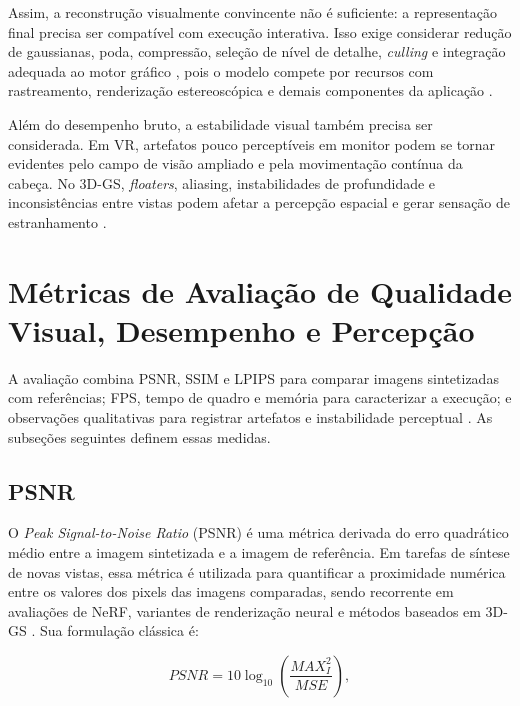 Assim, a reconstrução visualmente convincente não é suficiente: a representação final precisa ser compatível com execução interativa. Isso exige considerar redução de gaussianas, poda, compressão, seleção de nível de detalhe, \textit{culling} e integração adequada ao motor gráfico \cite{kerbl2023,lu2024scaffoldgs,fan2024lightgaussian,fei2025survey3dgs}, pois o modelo compete por recursos com rastreamento, renderização estereoscópica e demais componentes da aplicação \cite{metaquest3s2024,qualcommxr2gen2,tu2025}.

Além do desempenho bruto, a estabilidade visual também precisa ser considerada. Em VR, artefatos pouco perceptíveis em monitor podem se tornar evidentes pelo campo de visão ampliado e pela movimentação contínua da cabeça. No 3D-GS, \textit{floaters}, aliasing, instabilidades de profundidade e inconsistências entre vistas podem afetar a percepção espacial e gerar sensação de estranhamento \cite{kerbl2023,fei2025survey3dgs,chen2024survey3dgs,tu2025}.

\section{Métricas de Avaliação de Qualidade Visual, Desempenho e Percepção}

A avaliação combina PSNR, SSIM e LPIPS para comparar imagens sintetizadas com referências; FPS, tempo de quadro e memória para caracterizar a execução; e observações qualitativas para registrar artefatos e instabilidade perceptual \cite{wang2004,zhang2018,xu2023,tu2025}. As subseções seguintes definem essas medidas.

\subsection{PSNR}

O \textit{Peak Signal-to-Noise Ratio} (PSNR) é uma métrica derivada do erro quadrático médio entre a imagem sintetizada e a imagem de referência. Em tarefas de síntese de novas vistas, essa métrica é utilizada para quantificar a proximidade numérica entre os valores dos pixels das imagens comparadas, sendo recorrente em avaliações de NeRF, variantes de renderização neural e métodos baseados em 3D-GS \cite{mildenhall2020,barron2021mipnerf,kerbl2023,fei2025survey3dgs}. Sua formulação clássica é:

\begin{equation}
PSNR = 10 \log_{10}\left(\frac{MAX_I^2}{MSE}\right),
\label{eq:psnr}
\end{equation}

